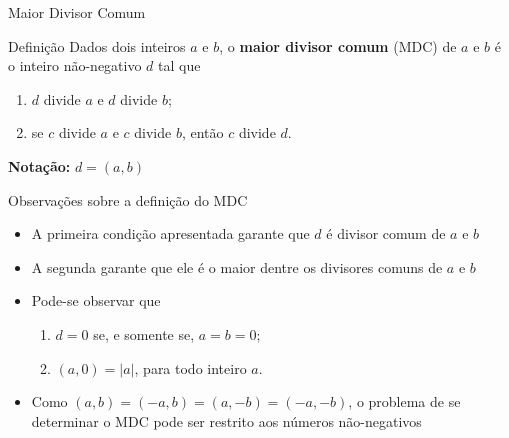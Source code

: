 \begin{frame}[fragile]{Maior Divisor Comum}

    \begin{block}{Definição}
        Dados dois inteiros $a$ e $b$, o \textbf{maior divisor comum} (MDC) de $a$ e $b$ é o inteiro não-negativo $d$ tal que

        \begin{enumerate}
            \item $d$ divide $a$ e $d$ divide $b$;
            \item se $c$ divide $a$ e $c$ divide $b$, então $c$ divide $d$.
        \end{enumerate}

        \vspace{0.1in}

        \textbf{Notação:} $d = (a, b)$
    \end{block}

\end{frame}

\begin{frame}[fragile]{Observações sobre a definição do MDC}

    \begin{itemize}
        \item A primeira condição apresentada garante que $d$ é divisor comum de $a$ e $b$

        \item A segunda garante que ele é o maior dentre os divisores comuns de $a$ e $b$

        \item Pode-se observar que

        \begin{enumerate}
            \item $d = 0$ se, e somente se, $a = b = 0$;
            \item $(a, 0) = |a|$, para todo inteiro $a$.
        \end{enumerate}

        \item Como $(a, b) = (-a, b) = (a, -b) = (-a,-b)$, o problema de se determinar o MDC pode ser restrito aos números não-negativos
    \end{itemize}

\end{frame}

